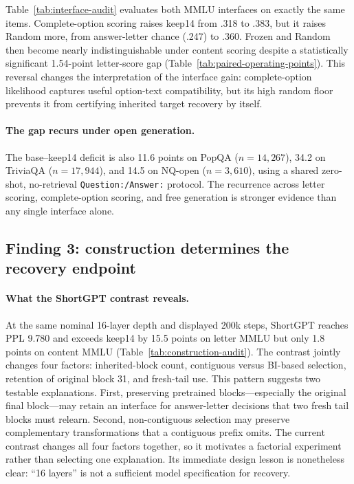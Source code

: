 Table~\ref{tab:interface-audit} evaluates both MMLU interfaces on exactly the
same items. Complete-option scoring raises keep14 from .318 to .383, but it
raises Random more, from answer-letter chance (.247) to .360. Frozen and Random
then become nearly indistinguishable under content scoring despite a
statistically significant 1.54-point letter-score gap
(Table~\ref{tab:paired-operating-points}). This reversal changes the interpretation
of the interface gain: complete-option likelihood captures useful option-text
compatibility, but its high random floor prevents it from certifying inherited
target recovery by itself.

\paragraph{The gap recurs under open generation.}
The base--keep14 deficit is also 11.6 points on PopQA
($n{=}14{,}267$), 34.2 on TriviaQA ($n{=}17{,}944$), and 14.5 on NQ-open
($n{=}3{,}610$), using a shared zero-shot, no-retrieval
\texttt{Question:/Answer:} protocol. The recurrence across letter scoring,
complete-option scoring, and free generation is stronger evidence than any
single interface alone.

\subsection{Finding 3: construction determines the recovery endpoint}


\paragraph{What the ShortGPT contrast reveals.}
At the same nominal 16-layer depth and displayed 200k steps, ShortGPT reaches
PPL 9.780 and exceeds keep14 by 15.5 points on letter MMLU but only 1.8 points
on content MMLU (Table~\ref{tab:construction-audit}). The contrast jointly
changes four factors: inherited-block count, contiguous versus BI-based
selection, retention of original block 31, and fresh-tail use.
This pattern suggests two testable explanations. First, preserving pretrained
blocks---especially the original final block---may retain an interface for
answer-letter decisions that two fresh tail blocks must relearn. Second,
non-contiguous selection may preserve complementary transformations that a
contiguous prefix omits. The current contrast changes all four factors
together, so it motivates a factorial experiment rather than selecting one
explanation. Its immediate design lesson is nonetheless clear: ``16 layers''
is not a sufficient model specification for recovery.

